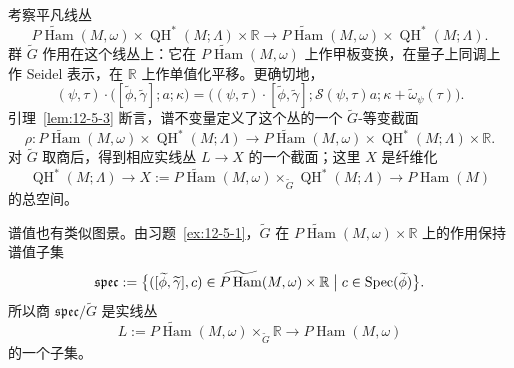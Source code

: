 \begin{remark}
考察平凡线丛
\[
  \widetilde{P\operatorname{Ham}}(M,\omega)
  \times\operatorname{QH}^*(M;\Lambda)\times\mathbb R
  \longrightarrow
  \widetilde{P\operatorname{Ham}}(M,\omega)
  \times\operatorname{QH}^*(M;\Lambda).
\]
群 $\widetilde G$ 作用在这个线丛上：它在
$\widetilde{P\operatorname{Ham}}(M,\omega)$ 上作甲板变换，在量子上同调上作 Seidel
表示，在 $\mathbb R$ 上作单值化平移。更确切地，
\[
  (\psi,\tau)\cdot
  \bigl([\widetilde\phi,\widetilde\gamma];a;\kappa\bigr)
  =\bigl((\psi,\tau)\cdot[\widetilde\phi,\widetilde\gamma];
  \mathcal S(\psi,\tau)a;
  \kappa+\widetilde\omega_\psi(\tau)\bigr).
\]
引理~\ref{lem:12-5-3} 断言，谱不变量定义了这个丛的一个 $\widetilde G$-等变截面
\[
  \rho:
  \widetilde{P\operatorname{Ham}}(M,\omega)
  \times\operatorname{QH}^*(M;\Lambda)
  \longrightarrow
  \widetilde{P\operatorname{Ham}}(M,\omega)
  \times\operatorname{QH}^*(M;\Lambda)\times\mathbb R.
\]
对 $\widetilde G$ 取商后，得到相应实线丛 $L\to X$ 的一个截面；这里 $X$ 是纤维化
\[
  \operatorname{QH}^*(M;\Lambda)
  \longrightarrow
  X:=\widetilde{P\operatorname{Ham}}(M,\omega)
  \times_{\widetilde G}\operatorname{QH}^*(M;\Lambda)
  \longrightarrow P\operatorname{Ham}(M)
\]
的总空间。

谱值也有类似图景。由习题~\ref{ex:12-5-1}，$\widetilde G$ 在
$\widetilde{P\operatorname{Ham}}(M,\omega)\times\mathbb R$ 上的作用保持谱值子集
\[
  \mathfrak{spec}:=
  \bigl\{([\widetilde\phi,\widetilde\gamma],c)
  \in\widetilde{P\operatorname{Ham}}(M,\omega)\times\mathbb R
  \bigm|c\in\operatorname{Spec}(\widetilde\phi)\bigr\}.
\]
所以商 $\mathfrak{spec}/\widetilde G$ 是实线丛
\[
  L:=\widetilde{P\operatorname{Ham}}(M,\omega)
  \times_{\widetilde G}\mathbb R
  \longrightarrow P\operatorname{Ham}(M,\omega)
\]
的一个子集。
\end{remark}

